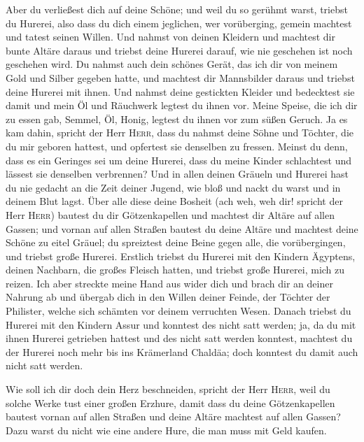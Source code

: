  Aber du verließest dich auf deine Schöne; und weil du so
gerühmt warst, triebst du Hurerei, also dass du dich einem jeglichen,
wer vorüberging, gemein machtest und tatest seinen Willen.
 Und nahmst von deinen Kleidern und machtest dir bunte
Altäre daraus und triebst deine Hurerei darauf, wie nie geschehen ist
noch geschehen wird.  Du nahmst auch dein schönes Gerät,
das ich dir von meinem Gold und Silber gegeben hatte, und machtest dir
Mannsbilder daraus und triebst deine Hurerei mit ihnen. 
Und nahmst deine gestickten Kleider und bedecktest sie damit und mein Öl
und Räuchwerk legtest du ihnen vor.  Meine Speise, die
ich dir zu essen gab, Semmel, Öl, Honig, legtest du ihnen vor zum süßen
Geruch. Ja es kam dahin, spricht der Herr \textsc{Herr}, 
dass du nahmst deine Söhne und Töchter, die du mir geboren hattest, und
opfertest sie denselben zu fressen. Meinst du denn, dass es ein Geringes
sei um deine Hurerei,  dass du meine Kinder schlachtest
und lässest sie denselben verbrennen?  Und in allen
deinen Gräueln und Hurerei hast du nie gedacht an die Zeit deiner
Jugend, wie bloß und nackt du warst und in deinem Blut lagst.
 Über alle diese deine Bosheit (ach weh, weh dir! spricht
der Herr \textsc{Herr})  bautest du dir Götzenkapellen
und machtest dir Altäre auf allen Gassen;  und vornan auf
allen Straßen bautest du deine Altäre und machtest deine Schöne zu eitel
Gräuel; du spreiztest deine Beine gegen alle, die vorübergingen, und
triebst große Hurerei.  Erstlich triebst du Hurerei mit
den Kindern Ägyptens, deinen Nachbarn, die großes Fleisch hatten, und
triebst große Hurerei, mich zu reizen.  Ich aber streckte
meine Hand aus wider dich und brach dir an deiner Nahrung ab und übergab
dich in den Willen deiner Feinde, der Töchter der Philister, welche sich
schämten vor deinem verruchten Wesen.  Danach triebst du
Hurerei mit den Kindern Assur und konntest des nicht satt werden; ja, da
du mit ihnen Hurerei getrieben hattest und des nicht satt werden
konntest,  machtest du der Hurerei noch mehr bis ins
Krämerland Chaldäa; doch konntest du damit auch nicht satt werden.

 Wie soll ich dir doch dein Herz beschneiden, spricht der
Herr \textsc{Herr}, weil du solche Werke tust einer großen Erzhure,
 damit dass du deine Götzenkapellen bautest vornan auf
allen Straßen und deine Altäre machtest auf allen Gassen? Dazu warst du
nicht wie eine andere Hure, die man muss mit Geld kaufen.


